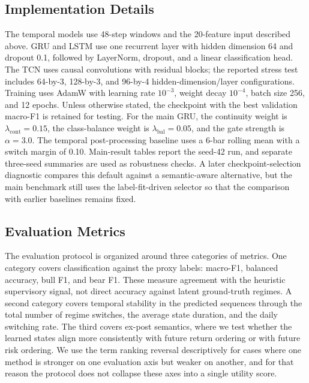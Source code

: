 \documentclass[a4paper,fleqn]{cas-dc}
\begin{document}
\subsection{Implementation Details}
The temporal models use 48-step windows and the 20-feature input described above. GRU and LSTM use one recurrent layer with hidden dimension 64 and dropout 0.1, followed by LayerNorm, dropout, and a linear classification head. The TCN uses causal convolutions with residual blocks; the reported stress test includes 64-by-3, 128-by-3, and 96-by-4 hidden-dimension/layer configurations. Training uses AdamW with learning rate $10^{-3}$, weight decay $10^{-4}$, batch size 256, and 12 epochs. Unless otherwise stated, the checkpoint with the best validation macro-F1 is retained for testing. For the main GRU, the continuity weight is $\lambda_{\mathrm{cont}}=0.15$, the class-balance weight is $\lambda_{\mathrm{bal}}=0.05$, and the gate strength is $\alpha=3.0$. The temporal post-processing baseline uses a 6-bar rolling mean with a switch margin of 0.10. Main-result tables report the seed-42 run, and separate three-seed summaries are used as robustness checks. A later checkpoint-selection diagnostic compares this default against a semantic-aware alternative, but the main benchmark still uses the label-fit-driven selector so that the comparison with earlier baselines remains fixed.

\subsection{Evaluation Metrics}
The evaluation protocol is organized around three categories of metrics. One category covers classification against the proxy labels: macro-F1, balanced accuracy, bull F1, and bear F1. These measure agreement with the heuristic supervisory signal, not direct accuracy against latent ground-truth regimes. A second category covers temporal stability in the predicted sequences through the total number of regime switches, the average state duration, and the daily switching rate. The third covers ex-post semantics, where we test whether the learned states align more consistently with future return ordering or with future risk ordering. We use the term ranking reversal descriptively for cases where one method is stronger on one evaluation axis but weaker on another, and for that reason the protocol does not collapse these axes into a single utility score.
\end{document}
